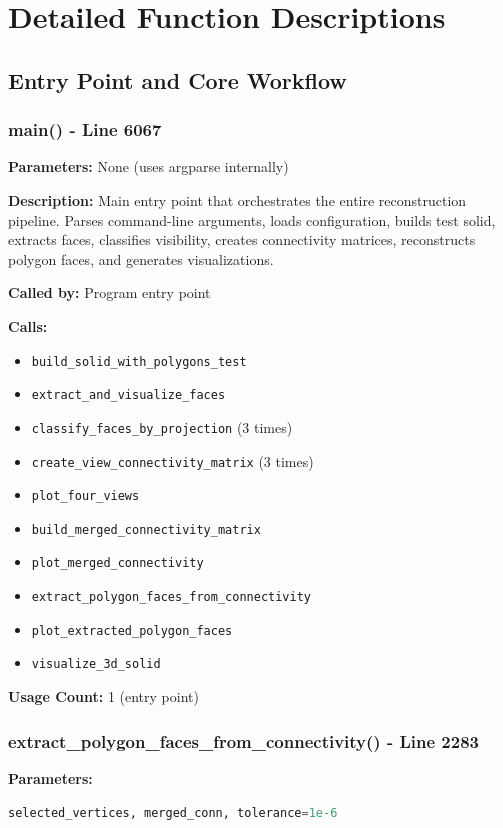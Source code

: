 \documentclass[11pt,a4paper]{article}
\begin{document}
\newpage
\section{Detailed Function Descriptions}

\subsection{Entry Point and Core Workflow}

\subsubsection{main() - Line 6067}
\textbf{Parameters:} None (uses argparse internally)

\textbf{Description:} 
Main entry point that orchestrates the entire reconstruction pipeline. Parses command-line arguments, loads configuration, builds test solid, extracts faces, classifies visibility, creates connectivity matrices, reconstructs polygon faces, and generates visualizations.

\textbf{Called by:} Program entry point

\textbf{Calls:} 
\begin{itemize}
    \item \texttt{build\_solid\_with\_polygons\_test}
    \item \texttt{extract\_and\_visualize\_faces}
    \item \texttt{classify\_faces\_by\_projection} (3 times)
    \item \texttt{create\_view\_connectivity\_matrix} (3 times)
    \item \texttt{plot\_four\_views}
    \item \texttt{build\_merged\_connectivity\_matrix}
    \item \texttt{plot\_merged\_connectivity}
    \item \texttt{extract\_polygon\_faces\_from\_connectivity}
    \item \texttt{plot\_extracted\_polygon\_faces}
    \item \texttt{visualize\_3d\_solid}
\end{itemize}

\textbf{Usage Count:} 1 (entry point)

\subsubsection{extract\_polygon\_faces\_from\_connectivity() - Line 2283}
\textbf{Parameters:} 
\begin{lstlisting}[language=Python]
selected_vertices, merged_conn, tolerance=1e-6
\end{lstlisting}
\end{document}
